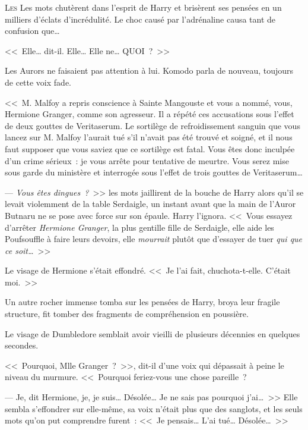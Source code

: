 
\lettrine{L}{es} Les mots chutèrent dans l'esprit de Harry et brisèrent ses pensées en un milliers d'éclats d'incrédulité. Le choc causé par l'adrénaline causa tant de confusion que…

<<~Elle… dit-il. Elle… Elle ne… QUOI~?~>>

Les Aurors ne faisaient pas attention à lui. Komodo parla de nouveau, toujours de cette voix fade.

<<~M. Malfoy a repris conscience à Sainte Mangouste et vous a nommé, vous, Hermione Granger, comme son agresseur. Il a répété ces accusations sous l'effet de deux gouttes de Veritaserum. Le sortilège de refroidissement sanguin que vous lancez sur M. Malfoy l'aurait tué s'il n'avait pas été trouvé et soigné, et il nous faut supposer que vous saviez que ce sortilège est fatal. Vous êtes donc inculpée d'un crime sérieux~: je vous arrête pour tentative de meurtre. Vous serez mise sous garde du ministère et interrogée sous l'effet de trois gouttes de Veritaserum…

--- \emph{Vous êtes dingues~?}~>> les mots jaillirent de la bouche de Harry alors qu'il se levait violemment de la table Serdaigle, un instant avant que la main de l'Auror Butnaru ne se pose avec force sur son épaule. Harry l'ignora. <<~Vous essayez d'arrêter \emph{Hermione Granger}, la plus gentille fille de Serdaigle, elle aide les Poufsouffle à faire leurs devoirs, elle \emph{mourrait} plutôt que d'essayer de tuer \emph{qui que ce soit…}~>>

Le visage de Hermione s'était effondré. <<~Je l'ai fait, chuchota-t-elle. C'était moi.~>>

Un autre rocher immense tomba sur les pensées de Harry, broya leur fragile structure, fit tomber des fragments de compréhension en poussière.

Le visage de Dumbledore semblait avoir vieilli de plusieurs décennies en quelques secondes.

<<~Pourquoi, Mlle Granger~?~>>, dit-il d'une voix qui dépassait à peine le niveau du murmure. <<~Pourquoi feriez-vous une chose pareille~?

--- Je, dit Hermione, je, je suis… Désolée… Je ne sais pas pourquoi j'ai…~>> Elle sembla s'effondrer sur elle-même, sa voix n'était plus que des sanglots, et les seuls mots qu'on put comprendre furent~: <<~Je pensais… L'ai tué… Désolée…~>>

